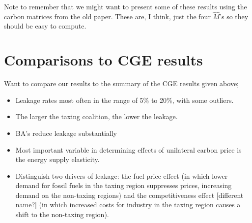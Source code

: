 \documentclass[notitlepage,12pt]{article}
\begin{document}
Note to remember that we might want to present some of these results using
the carbon matrices from the old paper. These are, I think, just the four $%
\hat{M}$'s so they should be easy to compute. 

\section{Comparisons to CGE results}

Want to compare our results to the summary of the CGE results given above;

\begin{itemize}
\item Leakage rates most often in the range of 5\% to 20\%, with some
outliers.

\item The larger the taxing coalition, the lower the leakage.

\item BA's reduce leakage substantially

\item Most important variable in determining effects of unilateral carbon
price is the energy supply elasticity.

\item Distinguish two drivers of leakage: the fuel price effect (in which
lower demand for fossil fuels in the taxing region suppresses prices,
increasing demand on the non-taxing regions) and the competitiveness effect
[different name?] (in which increased costs for industry in the taxing
region causes a shift to the non-taxing region).
\end{itemize}
\end{document}
